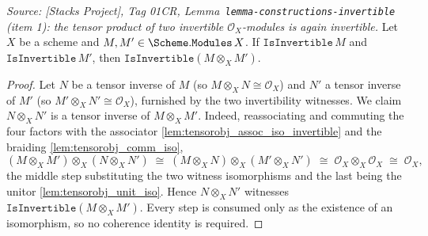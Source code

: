 \begin{lemma}


  \label{lem:isinvertible_tensor}
  \textit{Source: [Stacks Project], Tag 01CR,
  Lemma~\texttt{lemma-constructions-invertible} (item 1): the tensor product of two
  invertible \(\mathcal{O}_X\)-modules is again invertible.}
  Let \(X\) be a scheme and \(M, M' \in \Scheme.\mathtt{Modules}\,X\). If
  \(\mathtt{IsInvertible}\,M\) and \(\mathtt{IsInvertible}\,M'\), then
  \(\mathtt{IsInvertible}(M \otimes_X M')\).
\end{lemma}

\begin{proof}
  \leanok
  Let \(N\) be a tensor inverse of \(M\) (so \(M \otimes_X N \cong \mathcal{O}_X\))
  and \(N'\) a tensor inverse of \(M'\) (so \(M' \otimes_X N' \cong \mathcal{O}_X\)),
  furnished by the two invertibility witnesses. We claim \(N \otimes_X N'\) is a
  tensor inverse of \(M \otimes_X M'\). Indeed, reassociating and commuting the four
  factors with the associator \cref{lem:tensorobj_assoc_iso_invertible} and the
  braiding \cref{lem:tensorobj_comm_iso},
  \[
    (M \otimes_X M') \otimes_X (N \otimes_X N')
    \;\cong\;
    (M \otimes_X N) \otimes_X (M' \otimes_X N')
    \;\cong\;
    \mathcal{O}_X \otimes_X \mathcal{O}_X
    \;\cong\;
    \mathcal{O}_X,
  \]
  the middle step substituting the two witness isomorphisms and the last being the
  unitor \cref{lem:tensorobj_unit_iso}. Hence \(N \otimes_X N'\) witnesses
  \(\mathtt{IsInvertible}(M \otimes_X M')\). Every step is consumed only as the
  existence of an isomorphism, so no coherence identity is required.
\end{proof}

